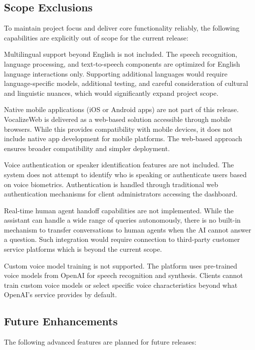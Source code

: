 \subsection{Scope Exclusions}

To maintain project focus and deliver core functionality reliably, the following capabilities are explicitly out of scope for the current release:

Multilingual support beyond English is not included. The speech recognition, language processing, and text-to-speech components are optimized for English language interactions only. Supporting additional languages would require language-specific models, additional testing, and careful consideration of cultural and linguistic nuances, which would significantly expand project scope.

Native mobile applications (iOS or Android apps) are not part of this release. VocalizeWeb is delivered as a web-based solution accessible through mobile browsers. While this provides compatibility with mobile devices, it does not include native app development for mobile platforms. The web-based approach ensures broader compatibility and simpler deployment.

Voice authentication or speaker identification features are not included. The system does not attempt to identify who is speaking or authenticate users based on voice biometrics. Authentication is handled through traditional web authentication mechanisms for client administrators accessing the dashboard.

Real-time human agent handoff capabilities are not implemented. While the assistant can handle a wide range of queries autonomously, there is no built-in mechanism to transfer conversations to human agents when the AI cannot answer a question. Such integration would require connection to third-party customer service platforms which is beyond the current scope.

Custom voice model training is not supported. The platform uses pre-trained voice models from OpenAI for speech recognition and synthesis. Clients cannot train custom voice models or select specific voice characteristics beyond what OpenAI's service provides by default.

\subsection{Future Enhancements}

The following advanced features are planned for future releases:

